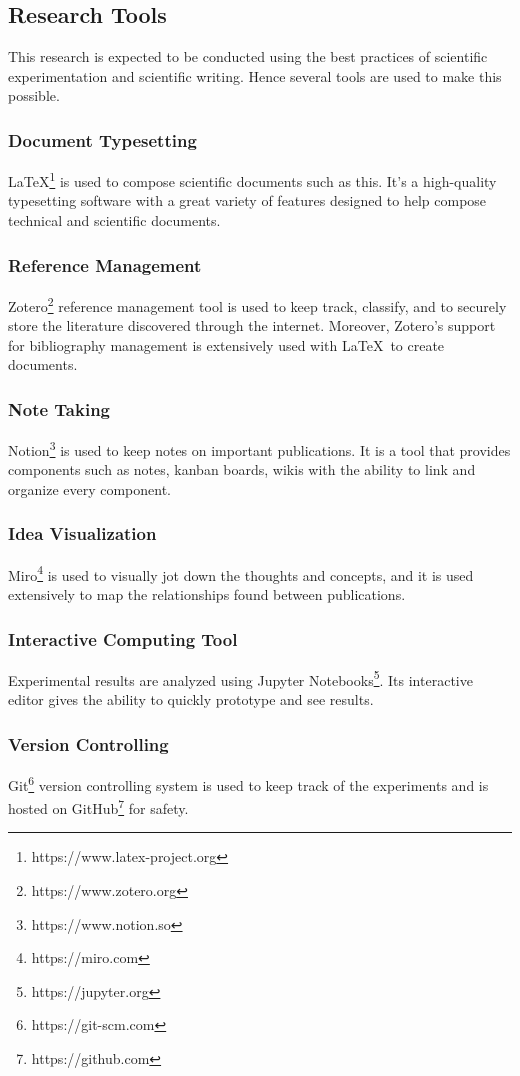 \documentclass[../main.tex]{subfiles}
\begin{document}
\subsection{Research Tools}

This research is expected to be conducted using the best practices of scientific experimentation and scientific writing. Hence several tools are used to make this possible.

\subsubsection{Document Typesetting}
\LaTeX\footnote{https://www.latex-project.org} is used to compose scientific documents such as this. It's a high-quality typesetting software with a great variety of features designed to help compose technical and scientific documents.

\subsubsection{Reference Management}
Zotero\footnote{https://www.zotero.org} reference management tool is used to keep track, classify, and to securely store the literature discovered through the internet. Moreover, Zotero's support for bibliography management is extensively used with \LaTeX\ to create documents.

\subsubsection{Note Taking}
Notion\footnote{https://www.notion.so} is used to keep notes on important publications. It is a tool that provides components such as notes, kanban boards, wikis with the ability to link and organize every component.

\subsubsection{Idea Visualization}
Miro\footnote{https://miro.com} is used to visually jot down the thoughts and concepts, and it is used extensively to map the relationships found between publications.

\subsubsection{Interactive Computing Tool}
Experimental results are analyzed using Jupyter Notebooks\footnote{https://jupyter.org}. Its interactive editor gives the ability to quickly prototype and see results.

\subsubsection{Version Controlling}
Git\footnote{https://git-scm.com} version controlling system is used to keep track of the experiments and is hosted on GitHub\footnote{https://github.com} for safety.
\end{document}
